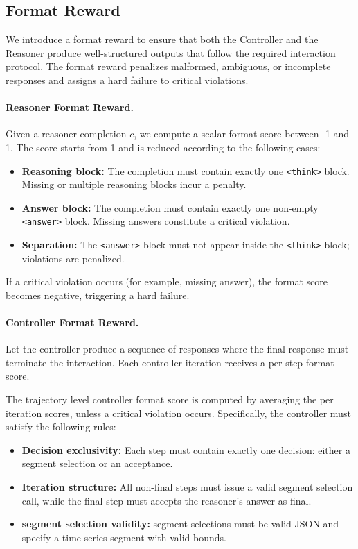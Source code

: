 \subsection{Format Reward}
\label{app:format_score}

We introduce a format reward to ensure that both the Controller and the Reasoner produce
well-structured outputs that follow the required interaction protocol.
The format reward penalizes malformed, ambiguous, or incomplete responses and assigns
a hard failure to critical violations.

\paragraph{Reasoner Format Reward.}
Given a reasoner completion \(c\), we compute a scalar format score between -1 and 1.
The score starts from 1 and is reduced according to the following cases:

\begin{itemize}
    \item \textbf{Reasoning block:} The completion must contain exactly one
    \texttt{<think>} block. Missing or multiple reasoning blocks incur a penalty.
    \item \textbf{Answer block:} The completion must contain exactly one non-empty
    \texttt{<answer>} block. Missing answers constitute a critical violation.
    \item \textbf{Separation:} The \texttt{<answer>} block must not appear inside
    the \texttt{<think>} block; violations are penalized.
\end{itemize}

If a critical violation occurs (for example, missing answer), the format score becomes negative,
triggering a hard failure.

\paragraph{Controller Format Reward.}
Let the controller produce a sequence of responses
where the final response must terminate the interaction.
Each controller iteration receives a per-step format score.

The trajectory level controller format score
is computed by averaging the per iteration scores, unless a critical violation occurs.
Specifically, the controller must satisfy the following rules:

\begin{itemize}
    \item \textbf{Decision exclusivity:} Each step must contain exactly one decision:
    either a segment selection or an acceptance.
    \item \textbf{Iteration structure:} All non-final steps must issue a valid segment selection call, while the final step must accepts the reasoner's answer as final.
    \item \textbf{segment selection validity:} segment selections must be valid JSON and specify a
    time-series segment with valid bounds.
\end{itemize}

